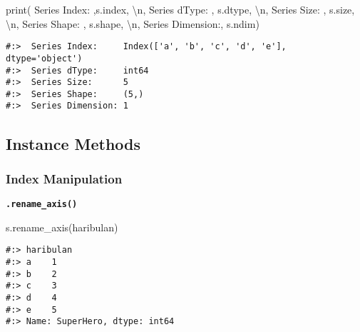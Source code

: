 \documentclass[
]{book}
\newenvironment{Shaded}{\begin{snugshade}}{\end{snugshade}}
\newcommand{\BuiltInTok}[1]{#1}
\newcommand{\CharTok}[1]{\textcolor[rgb]{0.5,0.5,0.5}{#1}}
\newcommand{\NormalTok}[1]{#1}
\newcommand{\StringTok}[1]{\textcolor[rgb]{0.5,0.5,0.5}{#1}}
\begin{document}
\begin{Shaded}
\begin{Highlighting}[]
\BuiltInTok{print}\NormalTok{( }\StringTok{\textquotesingle{} Series Index:    \textquotesingle{}}\NormalTok{,s.index, }\StringTok{\textquotesingle{}}\CharTok{\textbackslash{}n}\StringTok{\textquotesingle{}}\NormalTok{,}
       \StringTok{\textquotesingle{}Series dType:    \textquotesingle{}}\NormalTok{, s.dtype, }\StringTok{\textquotesingle{}}\CharTok{\textbackslash{}n}\StringTok{\textquotesingle{}}\NormalTok{,}
       \StringTok{\textquotesingle{}Series Size:     \textquotesingle{}}\NormalTok{, s.size, }\StringTok{\textquotesingle{}}\CharTok{\textbackslash{}n}\StringTok{\textquotesingle{}}\NormalTok{,}
       \StringTok{\textquotesingle{}Series Shape:    \textquotesingle{}}\NormalTok{, s.shape, }\StringTok{\textquotesingle{}}\CharTok{\textbackslash{}n}\StringTok{\textquotesingle{}}\NormalTok{,}
       \StringTok{\textquotesingle{}Series Dimension:\textquotesingle{}}\NormalTok{, s.ndim)}
\end{Highlighting}
\end{Shaded}

\begin{verbatim}
#:>  Series Index:     Index(['a', 'b', 'c', 'd', 'e'], dtype='object') 
#:>  Series dType:     int64 
#:>  Series Size:      5 
#:>  Series Shape:     (5,) 
#:>  Series Dimension: 1
\end{verbatim}

\hypertarget{instance-methods-2}{%
\subsection{Instance Methods}\label{instance-methods-2}}

\hypertarget{index-manipulation}{%
\subsubsection{Index Manipulation}\label{index-manipulation}}

\textbf{\texttt{.rename\_axis()}}

\begin{Shaded}
\begin{Highlighting}[]
\NormalTok{s.rename\_axis(}\StringTok{\textquotesingle{}haribulan\textquotesingle{}}\NormalTok{)}
\end{Highlighting}
\end{Shaded}

\begin{verbatim}
#:> haribulan
#:> a    1
#:> b    2
#:> c    3
#:> d    4
#:> e    5
#:> Name: SuperHero, dtype: int64
\end{verbatim}
\end{document}
